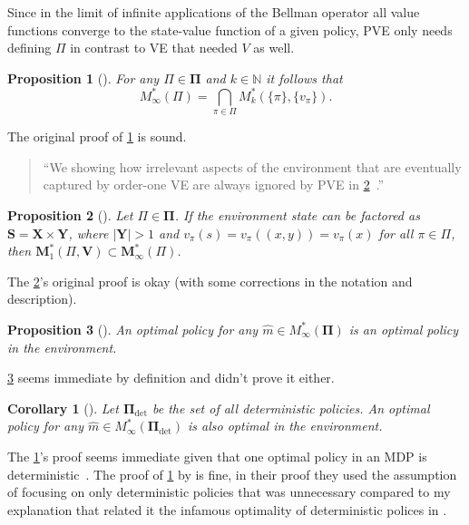 \documentclass[a4paper]{article}
\theoremstyle{definition}
\theoremstyle{remark}
\theoremstyle{plain}
\newtheorem{proposition}{Proposition}
\newtheorem{corollary}{Corollary}
\newcommand{\bS}{\mathbf{S}}
\newcommand{\bM}{\mathbf{M}}
\newcommand{\bV}{\mathbf{V}}
\newcommand{\bX}{\mathbf{X}}
\newcommand{\bY}{\mathbf{Y}}
\newcommand{\bPi}{\mathbf{\Pi}}
\newcommand{\N}{\mathbb{N}}
\begin{document}
Since in the limit of infinite applications of the Bellman operator all value functions converge to the state-value function of a given policy, PVE only needs defining $\Pi$ in contrast to VE that needed $V$ as well.
%
\begin{proposition}[{\normalfont\citet[Definition 2]{grimm2021proper}}]
    \label{prpstn:intrsct-ve}
    For any $\Pi \in \bPi$ and $k \in \N$ it follows that
    \begin{equation*}
        M_\infty^*(\Pi) = \bigcap_{\pi \in \Pi} M_k^*(\{\pi\}, \{v_\pi\}).
    \end{equation*}
\end{proposition}
The original proof of \cref{prpstn:intrsct-ve} is sound.
%
\begin{quote}
    ``We showing how irrelevant aspects of the environment that are eventually captured by order-one VE are always ignored by PVE in \cref{prpstn:pve-ignr-irrlvnt}~\citet{grimm2021proper}.''
\end{quote}
%
\begin{proposition}[{\normalfont\citet[Proposition 3]{grimm2021proper}}]
    \label{prpstn:pve-ignr-irrlvnt}
    Let $\Pi \in \bPi$. If the environment state can be factored as $\bS = \bX \times \bY$, where $|\bY| > 1$ and $v_\pi(s) = v_\pi((x, y)) = v_\pi(x)$ for all $\pi \in \Pi$, then $\bM^*_1(\Pi, \bV) \subset \bM^*_\infty(\Pi)$.
\end{proposition}
The \cref{prpstn:pve-ignr-irrlvnt}'s original proof is okay (with some corrections in the notation and description). 
%
\begin{proposition}[{\normalfont\citet[Proposition 4]{grimm2021proper}}]
    \label{prpstn:optml-plcy}
    An optimal policy for any $\hat{m} \in M^*_\infty(\bPi)$ is an optimal policy in the environment. 
\end{proposition}
\cref{prpstn:optml-plcy} seems immediate by definition and \citet{grimm2021proper} didn't prove it either.
%
\begin{corollary}[{\normalfont\citet[Corollary 1]{grimm2021proper}}]
    \label{crllry:det-plcy-is-engh}
    Let $\bPi_\mathrm{det}$ be the set of all deterministic policies. An optimal policy for any $\hat{m} \in M_\infty^*(\bPi_\mathrm{det})$ is also optimal in the environment.
\end{corollary}
The \cref{crllry:det-plcy-is-engh}'s proof seems immediate given that one optimal policy in an MDP is deterministic~\citep{puterman2014markov}. The proof of \cref{crllry:det-plcy-is-engh} by \citet{grimm2021proper} is fine, in their proof they used the assumption of focusing on only deterministic policies that was unnecessary compared to my explanation that related it the infamous optimality of deterministic polices in \citet{puterman2014markov}.
\end{document}
